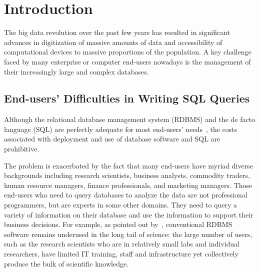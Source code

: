 \section{Introduction}
\label{sec:introduction}


The big data revolution over the past few years has resulted
in significant advances in digitization of massive amounts
of data and accessibility of computational devices to massive
proportions of the population. A key challenge faced by many
enterprise or computer end-users nowadays is the management
of their increasingly large and complex databases.




\subsection{End-users' Difficulties in Writing SQL Queries}
Although the relational database management system (RDBMS) and the
de facto language (SQL) are perfectly adequate for most end-users'
needs~\cite{Howe:2011}, the costs associated with deployment and
use of database software and SQL are prohibitive. 

The problem is exacerbated by the fact that many end-users
have myriad diverse backgrounds including research scientists,
business analysts, commodity traders, human resource managers,
finance professionals, and marketing managers. 
Those end-users who need to query databases to analyze the
data are not professional programmers, but are experts in some
other domains. They need to query a variety of information on their
database and use the information to support their business decisions.
For example, as pointed out
by~\cite{Gray:2005}, conventional RDBMS software remains underused
in the long tail of science: the large number of users, such as the
research scientists who are in relatively small labs and individual
researchers, have limited IT training, staff and infrastructure yet
collectively produce the bulk of scientific knowledge. 


